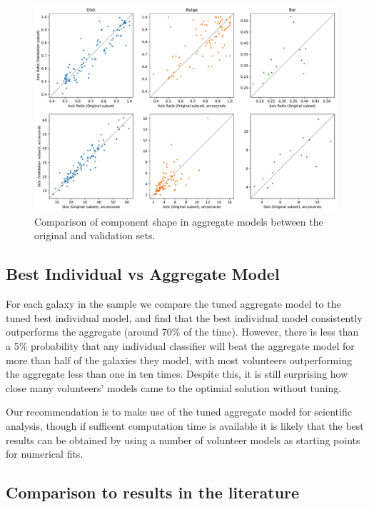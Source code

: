 \documentclass[../main.tex]{subfiles}
\begin{document}
\begin{figure}
  \includegraphics[width=17.3cm]{images__results/component_sizing.pdf}
  \caption{Comparison of component shape in aggregate models between the original and validation sets.}
  \label{fig:aggregate_model_consistency}
\end{figure}

\subsection{Best Individual vs Aggregate Model}

For each galaxy in the sample we compare the tuned aggregate model to the tuned best individual model, and find that the best individual model consistently outperforms the aggregate (around 70\% of the time). However, there is less than a 5\% probability that any individual classifier will beat the aggregate model for more than half of the galaxies they model, with most volunteers outperforming the aggregate less than one in ten times. Despite this, it is still surprising how close many volunteers' models came to the optimial solution without tuning.

Our recommendation is to make use of the tuned aggregate model for scientific analysis, though if sufficent computation time is available it is likely that the best results can be obtained by using a number of volunteer models as starting points for numerical fits.

\subsection{Comparison to results in the literature}
\end{document}
